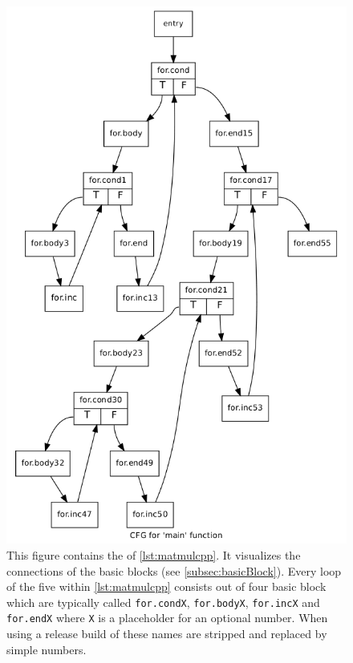 \begin{figure}[!h]
    \caption[The CFG of \autoref{lst:matmulcpp}]{
        This figure contains the \cfg of \autoref{lst:matmulcpp}.
        It visualizes the connections of the basic blocks (see \autoref{subsec:basicBlock}).
        Every loop of the five within \autoref{lst:matmulcpp} consists out of four basic block which are typically called \texttt{for.condX}, \texttt{for.bodyX}, \texttt{for.incX} and \texttt{for.endX} where \texttt{X} is a placeholder for an optional number.
        When using a release build of \llvm these names are stripped and replaced by simple numbers.
    }
    \label{fig:exampleCfg}
    \includegraphics[width=\textwidth]{gfx/matmulCfg.png}
\end{figure}
